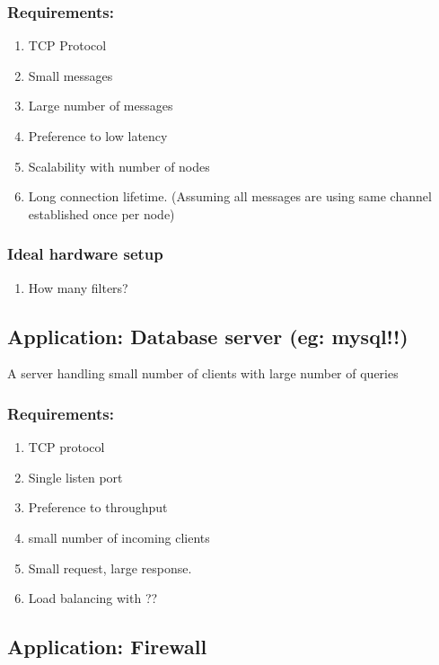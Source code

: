 \subsubsection{Requirements:}
\begin{enumerate}
    \item TCP Protocol
    \item Small messages
    \item Large number of messages
    \item Preference to low latency
    \item Scalability with number of nodes
    \item Long connection lifetime. (Assuming all messages are using same
            channel established once per node)
\end{enumerate}

\subsubsection{Ideal hardware setup}
\begin{enumerate}
    \item How many filters?
\end{enumerate}


\subsection{Application:  Database server (eg: mysql!!)}
A server handling small number of clients with large number of queries
\subsubsection{Requirements:}
\begin{enumerate}
    \item TCP protocol
    \item Single listen port
    \item Preference to throughput
    \item small number of incoming clients
    \item Small request, large response.
    \item Load balancing with ??
\end{enumerate}



\subsection{Application: Firewall}

